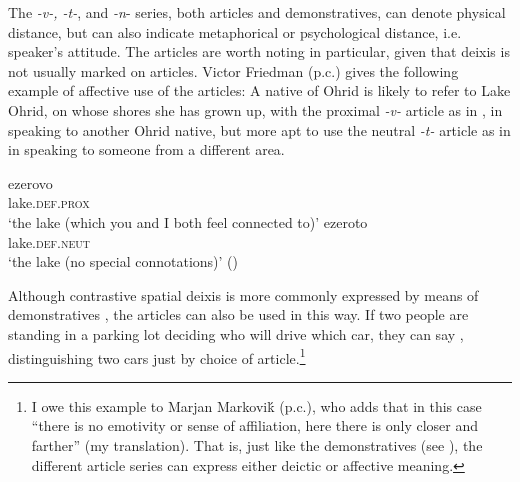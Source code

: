 \documentclass[output=paper]{langscibook}
\begin{document}
The  \textit{-v-, -t-}, and \textit{-n}- series, both articles and demonstratives, can denote physical distance, but can also indicate metaphorical or psychological distance, i.e. speaker's attitude. The articles are worth noting in particular, given that deixis is not usually marked on articles. Victor Friedman (p.c.) gives the following example of affective use of the articles: A native of Ohrid is likely to refer to Lake Ohrid, on whose shores she has grown up, with the proximal \textit{-v-} article as in , in speaking to another Ohrid native, but more apt to use the neutral \textit{-t-} article as in  in speaking to someone from a different area.

\ea\label{lake}
\ea\label{lake1}
\gll ezerovo \\
     lake.\textsc{def.prox} \\
\glt `the lake (which you and I both feel connected to)'
\ex \label{lake2}
\gll ezeroto \\
     lake.\textsc{def}.\textsc{neut} \\
\glt `the lake (no special connotations)' \hfill ()
\z\z

\noindent Although contrastive spatial deixis is more commonly expressed by means of demonstratives \citep{Karapejovski2017}, the articles can also be used in this way. If two people are standing in a parking lot deciding who will drive which car, they can say , distinguishing two cars just by choice of article.\footnote{I owe this example to Marjan Markoviḱ (p.c.), who adds that in this case ``there is no emotivity or sense of affiliation, here there is only closer and farther'' (my translation). That is, just like the demonstratives (see ), the different article series can express either deictic or affective meaning.}
\end{document}
